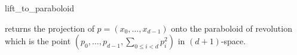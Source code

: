 \begin{ccRefFunction}{lift_to_paraboloid}

%
{returns the projection of $p = (x_0,\ldots,x_{d-1})$ onto the
  paraboloid of revolution which is the point $(p_0,
  \ldots,p_{d-1},\sum_{0 \le i < d}p_i^2)$ in $(d+1)$-space.}

\end{ccRefFunction}

